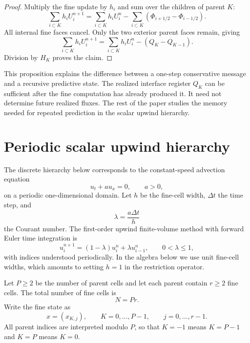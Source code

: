 \documentclass[pdflatex,sn-mathphys-num]{sn-jnl}%
\theoremstyle{thmstyleone}%
\theoremstyle{thmstyletwo}%
\theoremstyle{thmstylethree}%
\begin{document}
\begin{proof}
Multiply the fine update by \(h_i\) and sum over the children of parent
\(K\):
\[
  \sum_{i\subset K}h_i U_i^{n+1}
  =
  \sum_{i\subset K}h_i U_i^n
  -
  \sum_{i\subset K}(\Phi_{i+1/2}-\Phi_{i-1/2}).
\]
All internal fine faces cancel. Only the two exterior parent faces remain, giving
\[
  \sum_{i\subset K}h_i U_i^{n+1}
  =
  \sum_{i\subset K}h_i U_i^n
  -
  (Q_K-Q_{K-1}).
\]
Division by \(H_K\) proves the claim.
\end{proof}

This proposition explains the difference between a one-step conservative
message and a recursive predictive state.  The realized interface register \(Q_K\) can be
sufficient after the fine computation has already produced it.  It need not
determine future realized fluxes.  The rest of the paper studies the memory
needed for repeated prediction in the scalar upwind hierarchy.

\section{Periodic scalar upwind hierarchy} \label{sec:periodic}

The discrete hierarchy below corresponds to the constant-speed advection
equation
\[
  u_t+a u_x=0,
  \qquad a>0,
\]
on a periodic one-dimensional domain.  Let \(h\) be the fine-cell width,
\(\Delta t\) the time step, and
\[
  \lambda=\frac{a\Delta t}{h}
\]
the Courant number.  The first-order upwind finite-volume method with
forward Euler time integration is
\[
  u_i^{n+1}
  =
  (1-\lambda)u_i^n+\lambda u_{i-1}^n,
  \qquad 0<\lambda\le1,
\]
with indices understood periodically.  In the algebra below we use unit
fine-cell widths, which amounts to setting \(h=1\) in the restriction
operator.

Let \(P\ge2\) be the number of parent cells and let each parent contain
\(r\ge2\) fine cells.  The total number of fine cells is
\[
  N=Pr.
\]
Write the fine state as
\[
  x=(x_{K,j}),
  \qquad
  K=0,\ldots,P-1,
  \qquad
  j=0,\ldots,r-1.
\]
All parent indices are interpreted modulo \(P\), so that \(K=-1\) means
\(K=P-1\) and \(K=P\) means \(K=0\).
\end{document}
